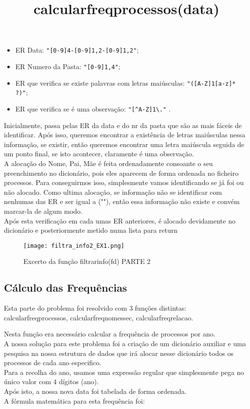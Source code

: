 \documentclass[11pt,a4paper]{report}%
\begin{document}
\begin{itemize}
  \item ER Data: \texttt{"[0-9]{4}-[0-9]{1,2}-[0-9]{1,2}"};
  \item ER Numero da Pasta: \texttt{"[0-9]{1,4}"};
  \item ER que verifica se existe palavras com letras maiúsculas: \texttt{"([A-Z]{1}[a-z]* ?)"};
  \item ER que verifica se é uma observação: \texttt{"[\textasciicircum A-Z]{1}\textbackslash ."} .
\end{itemize}

Inicialmente, passa pelas ER da data e do nr da pasta que são as mais fáceis de identificar. Após isso, queremos encontrar a existência de letras maiúsculas nessa informação, se existir, então queremos encontrar uma letra maiúscula seguida de um ponto final, se isto acontecer, claramente é uma observação.\\
A alocação do Nome, Pai, Mãe é feita ordenadamente consoante o seu preenchimento no dicionário, pois eles aparecem de forma ordenada no ficheiro processos. Para conseguirmos isso, simplesmente vamos identificando se já foi ou não alocado. Como ultima alocação, se informação não se identificar com nenhumas das ER e ser igual a (""), então essa informação não existe e convém marcar-la de algum modo.\\

Após esta verificação em cada umas ER anteriores, é alocado devidamente no dicionário e posteriormente metido numa lista para return

\begin{figure}[htbp]
\centerline{\texttt{[image: filtra\_info2\_EX1.png]}}
\caption{Excerto da função filtrar\textunderscore info(fd) PARTE 2}
\label{fig}
\end{figure} 

\subsection{Cálculo das Frequências} \label{subsec:freqCalc}
Esta parte do problema foi resolvido com 3 funções distintas: calcular\textunderscore freq\textunderscore processos, calcular\textunderscore freq\textunderscore nomes\textunderscore sec, calcular\textunderscore freq\textunderscore relacao.\\

\title{\textbf{calcular\textunderscore freq\textunderscore processos(data)}}

Nesta função era necessário calcular a frequência de processos por ano.\\
A nossa solução para este problema foi a criação de um dicionário auxiliar e uma pesquisa na nossa estrutura de dados que irá alocar nesse dicionário todos os processos de cada ano especifico.\\
Para a recolha do ano, usamos uma expressão regular que simplesmente pega no único valor com 4 dígitos (ano).\\
Após isto, a nossa nova data foi tabelada de forma ordenada.\\
A fórmula matemática para esta frequência foi:  \\
\end{document}
